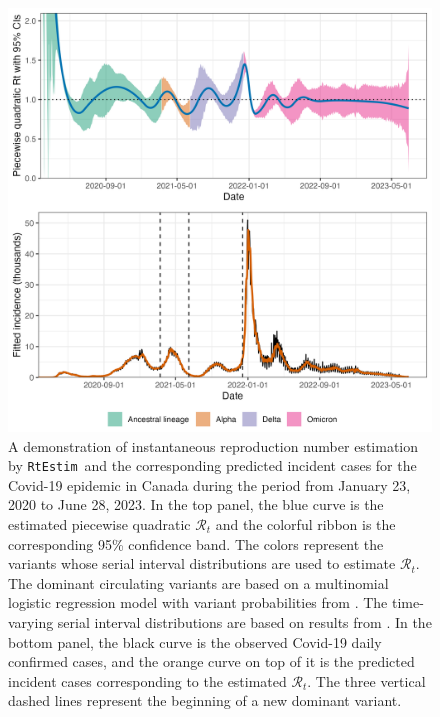\documentclass[10pt,letterpaper]{article}
\def\RtEstim{\texttt{RtEstim}}
\def\calR{\mathcal{R}}
\begin{document}
\begin{figure}[!t]
  \centering
  \includegraphics[width=.9\textwidth]{fig/intro-fig-new.png}
  \caption{A demonstration of instantaneous reproduction number estimation by
  \RtEstim\ and the corresponding predicted incident cases for the Covid-19
  epidemic in Canada during the period from January 23, 2020 to June 28, 2023.
  In the top panel, the blue curve is the estimated piecewise quadratic
  $\calR_t$ and the colorful ribbon is the corresponding 95\% confidence band.
  The colors represent the variants whose serial interval distributions are used
  to estimate $\calR_t$. The dominant circulating variants are based on a
  multinomial logistic regression model with variant probabilities from
  \cite{duotang_2023}. The time-varying serial interval distributions are 
  based on results from \cite{xu2023assessing}. 
  In the bottom panel, the black curve is the observed Covid-19
  daily confirmed cases, and the orange curve on top of it is the predicted
  incident cases corresponding to the estimated $\calR_t$. The three vertical
  dashed lines represent the beginning of a new dominant variant.}
  \label{fig:intro-fig}
\end{figure}
\end{document}
